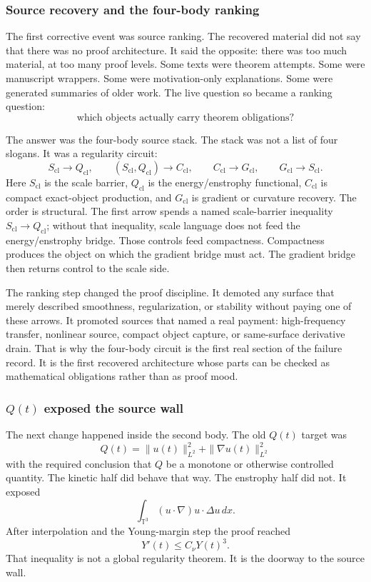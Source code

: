 \subsubsection{Source recovery and the four-body ranking}

The first corrective event was source ranking.
The recovered material did not say that there was no proof architecture.
It said the opposite: there was too much material, at too many proof levels.
Some texts were theorem attempts.
Some were manuscript wrappers.
Some were motivation-only explanations.
Some were generated summaries of older work.
The live question so became a ranking question:
\[
  \text{which objects actually carry theorem obligations?}
\]

The answer was the four-body source stack.
The stack was not a list of four slogans.
It was a regularity circuit:
\[
  S_{\mathrm{cl}}
  \to
  Q_{\mathrm{cl}},
  \qquad
  (S_{\mathrm{cl}},Q_{\mathrm{cl}})
  \to
  C_{\mathrm{cl}},
  \qquad
  C_{\mathrm{cl}}
  \to
  G_{\mathrm{cl}},
  \qquad
  G_{\mathrm{cl}}
  \to
  S_{\mathrm{cl}}.
\]
Here \(S_{\mathrm{cl}}\) is the scale barrier, \(Q_{\mathrm{cl}}\) is the
energy/enstrophy functional, \(C_{\mathrm{cl}}\) is compact exact-object
production, and \(G_{\mathrm{cl}}\) is gradient or curvature recovery.
The order is structural.
The first arrow spends a named scale-barrier inequality
\(S_{\mathrm{cl}}\to Q_{\mathrm{cl}}\); without that inequality, scale language
does not feed the energy/enstrophy bridge.
Those controls feed compactness.
Compactness produces the object on which the gradient bridge must act.
The gradient bridge then returns control to the scale side.

The ranking step changed the proof discipline.
It demoted any surface that merely described smoothness, regularization, or
stability without paying one of these arrows.
It promoted sources that named a real payment:
high-frequency transfer, nonlinear source, compact object capture, or
same-surface derivative drain.
That is why the four-body circuit is the first real section of the failure
record.
It is the first recovered architecture whose parts can be checked as
mathematical obligations rather than as proof mood.

\subsubsection{\(Q(t)\) exposed the source wall}

The next change happened inside the second body.
The old \(Q(t)\) target was
\[
  Q(t)=\|u(t)\|_{L^2}^2+\|\nabla u(t)\|_{L^2}^2
\]
with the required conclusion that \(Q\) be a monotone or otherwise controlled
quantity.
The kinetic half did behave that way.
The enstrophy half did not.
It exposed
\[
  \int_{\mathbb T^3}(u\cdot\nabla)u\cdot\Delta u\,dx .
\]
After interpolation and the Young-margin step the proof reached
\[
  Y'(t)\le C_\nu Y(t)^3 .
\]
That inequality is not a global regularity theorem.
It is the doorway to the source wall.

